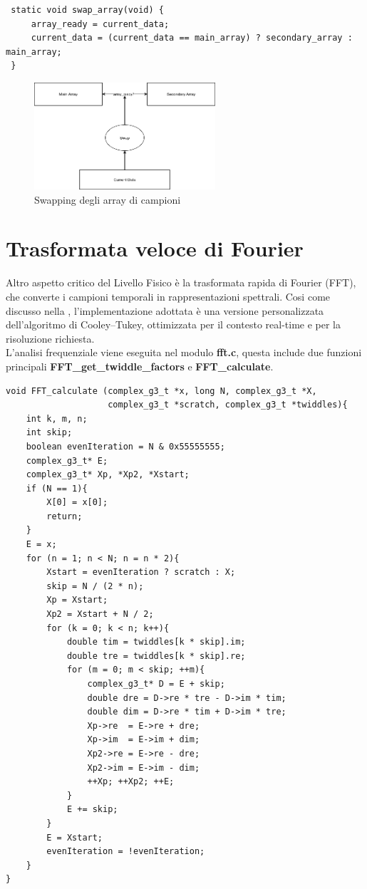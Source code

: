 \begin{verbatim}
 static void swap_array(void) {
     array_ready = current_data;
     current_data = (current_data == main_array) ? secondary_array : main_array;
 }
 \end{verbatim}

\begin{figure}[H]
    \centering
    \includegraphics[width=0.6\textwidth]{immagini/swapping_array.png}
    \caption{Swapping degli array di campioni}
    \label{fig:swapping_array}
\end{figure}

\section{Trasformata veloce di Fourier}
Altro aspetto critico del Livello Fisico è la trasformata rapida di Fourier (FFT), che converte i campioni temporali in rappresentazioni spettrali. 
Cosi come discusso nella \label{sec: livello_fisico}, l’implementazione adottata è una versione personalizzata dell’algoritmo di Cooley–Tukey, ottimizzata per
 il contesto real-time e per la risoluzione richiesta. \\
 L'analisi frequenziale viene eseguita nel modulo \textbf{fft.c}, questa include due funzioni principali \textbf{FFT\_get\_twiddle\_factors} e \textbf{FFT\_calculate}. \\

\begin{verbatim}
void FFT_calculate (complex_g3_t *x, long N, complex_g3_t *X,
                    complex_g3_t *scratch, complex_g3_t *twiddles){
    int k, m, n;
    int skip;
    boolean evenIteration = N & 0x55555555;
    complex_g3_t* E;
    complex_g3_t* Xp, *Xp2, *Xstart;
    if (N == 1){
        X[0] = x[0];
        return;
    }
    E = x;
    for (n = 1; n < N; n = n * 2){
        Xstart = evenIteration ? scratch : X;
        skip = N / (2 * n);
        Xp = Xstart;
        Xp2 = Xstart + N / 2;
        for (k = 0; k < n; k++){
            double tim = twiddles[k * skip].im;
            double tre = twiddles[k * skip].re;
            for (m = 0; m < skip; ++m){
                complex_g3_t* D = E + skip;
                double dre = D->re * tre - D->im * tim;
                double dim = D->re * tim + D->im * tre;
                Xp->re  = E->re + dre;
                Xp->im  = E->im + dim;
                Xp2->re = E->re - dre;
                Xp2->im = E->im - dim;
                ++Xp; ++Xp2; ++E;
            }
            E += skip;
        }
        E = Xstart;
        evenIteration = !evenIteration;
    }
}
\end{verbatim}

